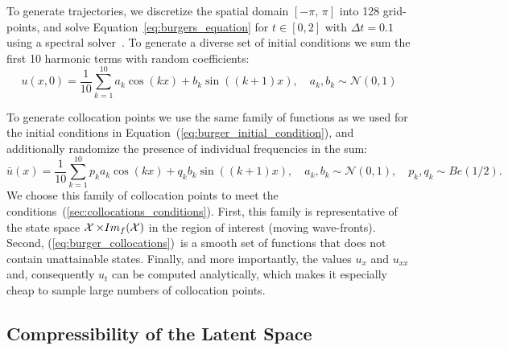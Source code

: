 To generate trajectories, we discretize the spatial domain $[-\pi,\,\pi]$ into 128 grid-points, and solve Equation~\ref{eq:burgers_equation} for $t \in [0, 2]$ with $\Delta t = 0.1$ using a spectral solver~\citep{trefethen2000spectral}. To generate a diverse set of initial conditions we sum the first 10 harmonic terms with random coefficients:
\begin{equation}
    \label{eq:burger_initial_condition}
    u(x, 0) = \frac{1}{10}\sum_{k = 1}^{10} a_k\cos(kx) + b_k\sin((k+1)x), \quad a_k, b_k \sim \mathcal{N}(0, 1)
\end{equation}

To generate collocation points we use the same family of functions as we used for the initial conditions in Equation~(\ref{eq:burger_initial_condition}), and additionally randomize the presence of individual frequencies in the sum:
\begin{equation}
    \label{eq:burger_collocations}
    \bar{u}(x) = \frac{1}{10}\sum_{k = 1}^{10} p_ka_k\cos(kx) + q_kb_k\sin((k+1)x), \quad a_k, b_k \sim \mathcal{N}(0, 1), \quad p_k, q_k \sim Be(1/2).
\end{equation}
We choose this family of collocation points to meet the conditions~(\ref{sec:collocations_conditions}). First, this family is representative of the state space $\operatorname{\mathcal{X}}\times Im_f(\operatorname{\mathcal{X}})$ in the region of interest (moving wave-fronts). Second, (\ref{eq:burger_collocations})~is a smooth set of functions that does not contain unattainable states. Finally, and more importantly, the values $u_x$ and $u_{xx}$ and, consequently $u_t$ can be computed analytically, which makes it especially cheap to sample large numbers of collocation points. 

\subsection{Compressibility of the Latent Space}


